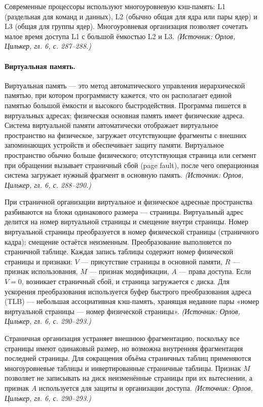 \documentclass[a4paper,12pt]{article}
\begin{document}
Современные процессоры используют многоуровневую кэш-память: L1 (раздельная для команд и данных), L2 (обычно общая для ядра или пары ядер) и L3 (общая для группы ядер). Многоуровневая организация позволяет сочетать малое время доступа L1 с большой ёмкостью L2 и L3.
\textit{(Источник: Орлов, Цилькер, гл. 6, с. 287--288.)}

\paragraph{Виртуальная память.}
Виртуальная память --- это метод автоматического управления иерархической памятью, при котором программисту кажется, что он располагает единой памятью большой ёмкости и высокого быстродействия. Программа пишется в виртуальных адресах; физическая основная память имеет физические адреса. Система виртуальной памяти автоматически отображает виртуальное пространство на физическое, загружает отсутствующие фрагменты с внешних запоминающих устройств и обеспечивает защиту памяти. Виртуальное пространство обычно больше физического; отсутствующая страница или сегмент при обращении вызывает страничный сбой (page fault), после чего операционная система загружает нужный фрагмент в основную память.
\textit{(Источник: Орлов, Цилькер, гл. 6, с. 288--290.)}

При страничной организации виртуальное и физическое адресные пространства разбиваются на блоки одинакового размера --- страницы. Виртуальный адрес делится на номер виртуальной страницы и смещение внутри страницы. Номер виртуальной страницы преобразуется в номер физической страницы (страничного кадра); смещение остаётся неизменным. Преобразование выполняется по страничной таблице. Каждая запись таблицы содержит номер физической страницы и признаки: \(V\) --- присутствие страницы в основной памяти, \(R\) --- признак использования, \(M\) --- признак модификации, \(A\) --- права доступа. Если \(V=0\), возникает страничный сбой, и страница загружается с диска. Для ускорения преобразования используется буфер быстрого преобразования адреса (TLB) --- небольшая ассоциативная кэш-память, хранящая недавние пары «номер виртуальной страницы --- номер физической страницы».
\textit{(Источник: Орлов, Цилькер, гл. 6, с. 290--293.)}

Страничная организация устраняет внешнюю фрагментацию, поскольку все страницы имеют одинаковый размер, но возможна внутренняя фрагментация последней страницы. Для сокращения объёма страничных таблиц применяются многоуровневые таблицы и инвертированные страничные таблицы. Признак \(M\) позволяет не записывать на диск неизменённые страницы при их вытеснении, а признак \(A\) используется для защиты и организации доступа.
\textit{(Источник: Орлов, Цилькер, гл. 6, с. 290--293.)}
\end{document}
